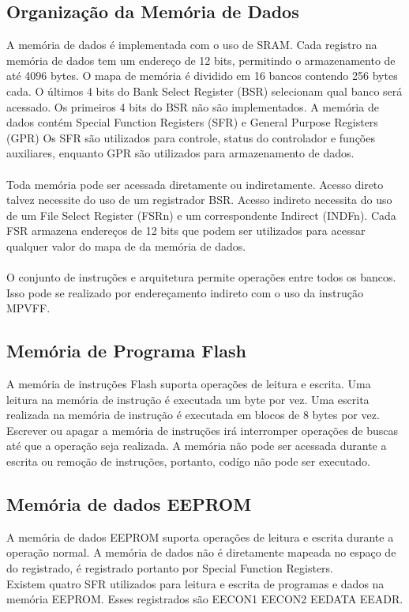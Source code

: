 \documentclass[12pt]{article}
\begin{document}
\subsection{Organização da Memória de Dados}
A memória de dados é implementada com o uso de SRAM. Cada registro na memória de dados tem um endereço de 12 bits, permitindo o armazenamento de até 4096 bytes. O mapa de memória é dividido em 16 bancos contendo 256 bytes cada. O últimos 4 bits do Bank Select Register (BSR) selecionam qual banco será acessado. Os primeiros 4 bits do BSR não são implementados. A memória de dados contém Special Function Registers (SFR) e General Purpose Registers (GPR) Os SFR são utilizados para controle, status do controlador e funções auxiliares, enquanto GPR são utilizados para armazenamento de dados.
\\\\Toda memória pode ser acessada diretamente ou indiretamente. Acesso direto talvez necessite do uso de um registrador BSR. Acesso indireto necessita do uso de um File Select Register (FSRn) e um correspondente Indirect (INDFn). Cada FSR armazena endereços de 12 bits que podem ser utilizados para acessar qualquer valor do mapa de da memória de dados.
\\\\O conjunto de instruções e arquitetura permite operações entre todos os bancos. Isso pode se realizado por endereçamento indireto com o uso da instrução MPVFF. 
\subsection{Memória de Programa Flash}
A memória de instruções Flash suporta operações de leitura e escrita. Uma leitura na memória de instrução é executada um byte por vez. Uma escrita realizada na memória de instrução é executada em blocos de 8 bytes por vez.
\\Escrever ou apagar a memória de instruções irá interromper operações de buscas até que a operação seja realizada. A memória não pode ser acessada durante a escrita ou remoção de instruções, portanto, codígo não pode ser executado.
\subsection{Memória de dados EEPROM}
A memória de dados EEPROM suporta operações de leitura e escrita durante a operação normal. A memória de dados não é diretamente mapeada no espaço de do registrado, é registrado portanto por Special Function Registers.
\\Existem quatro SFR utilizados para leitura e escrita de programas e dados na memória EEPROM. Esses registrados são EECON1 EECON2 EEDATA EEADR.
\end{document}

